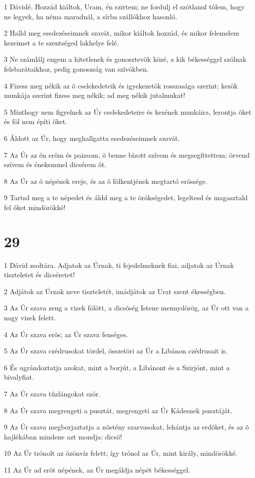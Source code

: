 \par 1 Dávidé. Hozzád kiáltok, Uram, én szirtem; ne fordulj el szótlanul tõlem, hogy ne legyek, ha néma maradnál, a sírba szállókhoz hasonló.
\par 2 Halld meg esedezéseimnek szavát, mikor kiáltok hozzád, és mikor felemelem kezeimet a te szentséged lakhelye felé.
\par 3 Ne számlálj engem a hitetlenek és gonosztevõk közé, a kik békességgel szólnak felebarátaikhoz, pedig gonoszság van szívökben.
\par 4 Fizess meg nékik az õ cselekedeteik és igyekezetök rosszasága szerint; kezök munkája szerint fizess meg nékik; ad meg nékik jutalmukat!
\par 5 Minthogy nem figyelnek az Úr cselekedeteire és kezének munkáira, lerontja õket és föl nem építi õket.
\par 6 Áldott az Úr, hogy meghallgatta esedezéseimnek szavát.
\par 7 Az Úr az én erõm és paizsom, õ benne bízott szívem és megsegíttettem; örvend szívem és énekemmel dicsérem õt.
\par 8 Az Úr az õ népének ereje, és az õ fölkentjének megtartó erõssége.
\par 9 Tartsd meg a te népedet és áldd meg a te örökségedet, legeltesd és magasztald fel õket mindörökké!

\chapter{29}

\par 1 Dávid zsoltára. Adjatok az Úrnak, ti fejedelmeknek fiai, adjatok az Úrnak tiszteletet és dicséretet!
\par 2 Adjátok az Úrnak neve tiszteletét, imádjátok az Urat szent ékességben.
\par 3 Az Úr szava zeng a vizek fölött, a dicsõség Istene mennydörög, az Úr ott van a nagy vizek felett.
\par 4 Az Úr szava erõs; az Úr szava fenséges.
\par 5 Az Úr szava czédrusokat tördel, összetöri az Úr a Libánon czédrusait is.
\par 6 És ugrándoztatja azokat, mint a borjút, a Libánont és a Szirjónt, mint a bivalyfiat.
\par 7 Az Úr szava tûzlángokat szór.
\par 8 Az Úr szava megrengeti a pusztát, megrengeti az Úr Kádesnek pusztáját.
\par 9 Az Úr szava megborjaztatja a nõstény szarvasokat, lehántja az erdõket, és az õ hajlékában mindene azt mondja: dicsõ!
\par 10 Az Úr trónolt az özönvíz felett; így trónol az Úr, mint király, mindörökké.
\par 11 Az Úr ad erõt népének, az Úr megáldja népét békességgel.

